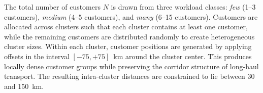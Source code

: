 \documentclass[3p,11pt,authoryear]{elsarticle}  %
\begin{document}
The total number of customers \(N\) is drawn from three workload classes: \emph{few} (1--3 customers), \emph{medium} (4--5 customers), and \emph{many} (6--15 customers). Customers are allocated across clusters such that each cluster contains at least one customer, while the remaining customers are distributed randomly to create heterogeneous cluster sizes. Within each cluster, customer positions are generated by applying offsets in the interval \([-75,+75]\)~km around the cluster center. This produces locally dense customer groups while preserving the corridor structure of long-haul transport. The resulting intra-cluster distances are constrained to lie between 30 and 150~km.

\end{document}
